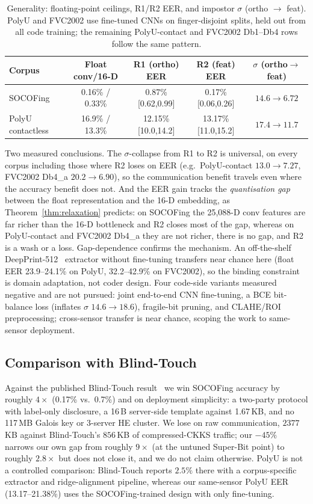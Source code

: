\begin{table}[htbp]
\centering
\caption{Generality: floating-point ceilings, R1/R2 EER, and impostor $\sigma$ (ortho $\to$ feat).
PolyU and FVC2002 use fine-tuned CNNs on finger-disjoint splits, held out from all code training; the
remaining PolyU-contact and FVC2002 Db1--Db4 rows follow the same pattern.}
\label{tab:generality}
\small
\begin{tabular}{@{}lcccc@{}}
\toprule
Corpus & Float conv/16-D & R1 (ortho) EER & R2 (feat) EER & $\sigma$ (ortho$\to$feat) \\
\midrule
SOCOFing & 0.16\% / 0.33\% & 0.87\% [0.62,0.99] & 0.17\% [0.06,0.26] & $14.6\to6.72$ \\
PolyU contactless & 16.9\% / 13.3\% & 12.15\% [10.0,14.2] & 13.17\% [11.0,15.2] & $17.4\to11.7$ \\
\bottomrule
\end{tabular}
\end{table}

Two measured conclusions. The $\sigma$-collapse from R1 to R2 is universal, on every corpus including
those where R2 loses on EER (e.g.\ PolyU-contact $13.0\to7.27$, FVC2002 Db4\_a $20.2\to6.90$), so the
communication benefit travels even where the accuracy benefit does not. And the EER gain tracks the
\emph{quantisation gap} between the float representation and the 16-D embedding, as
Theorem~\ref{thm:relaxation} predicts: on SOCOFing the 25,088-D conv features are far richer than the
16-D bottleneck and R2 closes most of the gap, whereas on PolyU-contact and FVC2002 Db4\_a they are not
richer, there is no gap, and R2 is a wash or a loss. Gap-dependence confirms the mechanism. An
off-the-shelf DeepPrint-512~\cite{EngelsmaCaoJain19} extractor without fine-tuning transfers near chance
here (float EER 23.9--24.1\% on PolyU, 32.2--42.9\% on FVC2002), so the binding constraint is domain
adaptation, not coder design. Four code-side variants measured negative and are not pursued: joint
end-to-end CNN fine-tuning, a BCE bit-balance loss (inflates $\sigma$ $14.6\to18.6$), fragile-bit
pruning, and CLAHE/ROI preprocessing; cross-sensor transfer is near chance, scoping the work to
same-sensor deployment.

\subsection{Comparison with Blind-Touch}

Against the published Blind-Touch result~\cite{ChoiWooKim24} we win SOCOFing accuracy by roughly
$4\times$ (0.17\% vs.\ 0.7\%) and on deployment simplicity: a two-party protocol with label-only
disclosure, a 16\,B server-side template against 1.67\,KB, and no 117\,MB Galois key or 3-server HE
cluster. We lose on raw communication, $2377$\,KB against Blind-Touch's $856$\,KB of compressed-CKKS
traffic; our $-45\%$ narrows our own gap from roughly $9\times$ (at the untuned Super-Bit point) to
roughly $2.8\times$ but does not close it, and we do not claim otherwise. PolyU is not a controlled
comparison: Blind-Touch reports $2.5\%$ there with a corpus-specific extractor and ridge-alignment
pipeline, whereas our same-sensor PolyU EER (13.17--21.38\%) uses the SOCOFing-trained design with only
fine-tuning.
